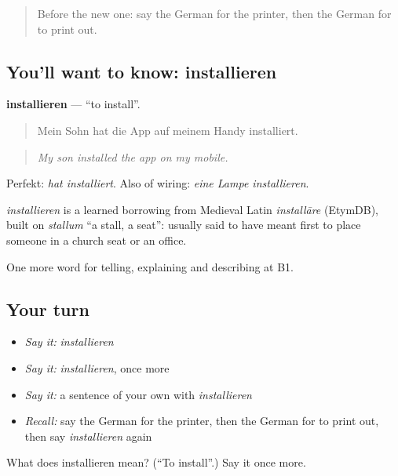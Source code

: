 \begin{quote}
Before the new one: say the German for the printer, then the German for to print out.
\end{quote}

\subsection*{You'll want to know: installieren}
\textbf{installieren} — \textquotedblleft{}to install\textquotedblright{}.

\begin{quote}
Mein Sohn hat die App auf meinem Handy installiert.
\end{quote}

\begin{quote}
\emph{My son installed the app on my mobile.}
\end{quote}

Perfekt: \emph{hat installiert}. Also of wiring: \emph{eine Lampe installieren}.

\begin{cousinweb}
\emph{installieren} is a learned borrowing from Medieval Latin \emph{installāre} (EtymDB), built on \emph{stallum} \textquotedblleft{}a stall, a seat\textquotedblright{}: usually said to have meant first to place someone in a church seat or an office.
\end{cousinweb}

\begin{grammarlens}[title={What you've built}]
One more word for telling, explaining and describing at B1.
\end{grammarlens}

\subsection*{Your turn}
\begin{itemize}
\raggedright
  \item \emph{Say it:} \emph{installieren}
  \item \emph{Say it:} \emph{installieren}, once more
  \item \emph{Say it:} a sentence of your own with \emph{installieren}
  \item \emph{Recall:} say the German for the printer, then the German for to print out, then say \emph{installieren} again
\end{itemize}

\begin{tcolorbox}[breakable,colback=teal!4,colframe=teal!35!black,title={Before you move on}]
What does installieren mean? (\textquotedblleft{}To install\textquotedblright{}.) Say it once more.
\end{tcolorbox}
